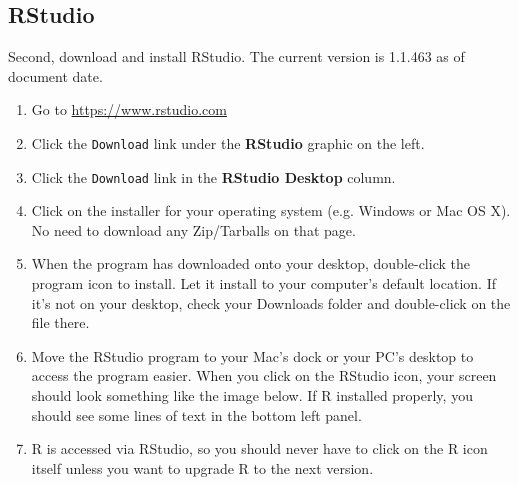 \documentclass[10pt, a4paper]{article}   	%
\begin{document}
\subsection*{RStudio}
Second, download and install RStudio. The current version is 1.1.463 as of document date.

\begin{enumerate}
	\item Go to \url{https://www.rstudio.com}
	\item Click the \texttt{Download} link under the \textbf{RStudio} graphic on the left.
	\item Click the \texttt{Download} link in the \textbf{RStudio Desktop} column.
	\item Click on the installer for your operating system (e.g. Windows or Mac OS X). No need to download any Zip/Tarballs on that page.
	\item When the program has downloaded onto your desktop, double-click the program icon to install. Let it install to your computer's default location. If it's not on your desktop, check your Downloads folder and double-click on the file there.
	\item Move the RStudio program to your Mac's dock or your PC's desktop to access the program easier. When you click on the RStudio icon, your screen should look something like the image below. If R installed properly, you should see some lines of text in the bottom left panel.
	\item R is accessed via RStudio, so you should never have to click on the R icon itself unless you want to upgrade R to the next version.
\end{enumerate}
\end{document}
